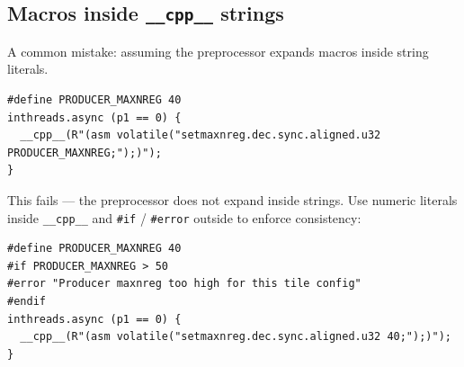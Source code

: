 \subsection*{Macros inside \texttt{\_\_cpp\_\_} strings}

A common mistake: assuming the preprocessor expands macros inside string literals.

\begin{lstlisting}[language=croqtile,caption={A macro inside a cpp string}]
#define PRODUCER_MAXNREG 40
inthreads.async (p1 == 0) {
  __cpp__(R"(asm volatile("setmaxnreg.dec.sync.aligned.u32 PRODUCER_MAXNREG;");)");
}
\end{lstlisting}

This fails --- the preprocessor does not expand inside strings. Use numeric literals inside \texttt{\_\_cpp\_\_} and \texttt{\#if} / \texttt{\#error} outside to enforce consistency:

\begin{lstlisting}[language=croqtile,caption={Its expanded form}]
#define PRODUCER_MAXNREG 40
#if PRODUCER_MAXNREG > 50
#error "Producer maxnreg too high for this tile config"
#endif
inthreads.async (p1 == 0) {
  __cpp__(R"(asm volatile("setmaxnreg.dec.sync.aligned.u32 40;");)");
}
\end{lstlisting}
